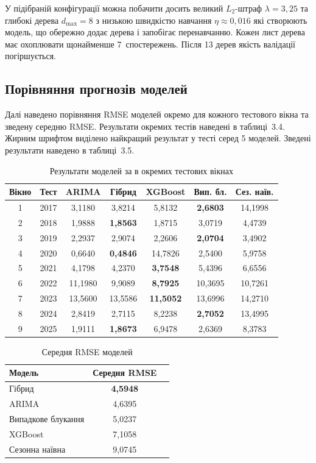 \documentclass{bachelor_thesis}
\begin{document}
У підібраній конфігурації можна побачити досить великий $L_2$-штраф $\lambda = 3{,}25$ та глибокі дерева $d_{\max} = 8$ з низькою швидкістю навчання $\eta \approx 0{,}016$ які створюють модель, що обережно додає дерева і запобігає перенавчанню. Кожен лист дерева має охоплювати щонайменше 7~спостережень. Після 13 дерев якість валідації погіршується.

\subsection{Порівняння прогнозів моделей}

Далі наведено порівняння RMSE моделей окремо для кожного тестового вікна та зведену середню RMSE. Результати окремих тестів наведені в таблиці~3.4. Жирним шрифтом виділено найкращий результат у тесті серед 5 моделей. Зведені результати наведено в таблиці~3.5.

\begin{table}[!ht]
\centering
\begin{tabular}{|c|c|c|c|c|c|c|}
\hline
\textbf{Вікно} & \textbf{Тест} & \textbf{ARIMA} & \textbf{Гібрид} & \textbf{XGBoost} & \textbf{Вип. бл.} & \textbf{Сез. наїв.} \\
\hline
1 & 2017 & 3{,}1180 & 3{,}8214 & 5{,}8132 & \textbf{2{,}6803} & 14{,}1998 \\
2 & 2018 & 1{,}9888 & \textbf{1{,}8563} & 1{,}8715 & 3{,}0719 & 4{,}4739 \\
3 & 2019 & 2{,}2937 & 2{,}9074 & 2{,}2606 & \textbf{2{,}0704} & 3{,}4902 \\
4 & 2020 & 0{,}6640 & \textbf{0{,}4846} & 14{,}7826 & 2{,}5400 & 5{,}9758 \\
5 & 2021 & 4{,}1798 & 4{,}2370 & \textbf{3{,}7548} & 5{,}4396 & 6{,}6556 \\
6 & 2022 & 11{,}1980 & 9{,}9089 & \textbf{8{,}7925} & 10{,}3695 & 10{,}7261 \\
7 & 2023 & 13{,}5600 & 13{,}5586 & \textbf{11{,}5052} & 13{,}6996 & 14{,}2710 \\
8 & 2024 & 2{,}8419 & 2{,}7115 & 8{,}2238 & \textbf{2{,}7052} & 13{,}4995 \\
9 & 2025 & 1{,}9111 & \textbf{1{,}8673} & 6{,}9478 & 2{,}6369 & 8{,}3783 \\
\hline
\end{tabular}
\caption{Результати моделей за в окремих тестових вікнах}
\end{table}

\begin{table}[h!]
\centering
\begin{tabular}{|l|c|c|}
\hline
\textbf{Модель} & \textbf{Середня RMSE} \\
\hline
Гібрид              & \textbf{4{,}5948} \\
ARIMA               & 4{,}6395 \\
Випадкове блукання  & 5{,}0237 \\
XGBoost             & 7{,}1058 \\
Сезонна наївна      & 9{,}0745 \\
\hline
\end{tabular}
\caption{Середня RMSE моделей}
\end{table}
\end{document}
